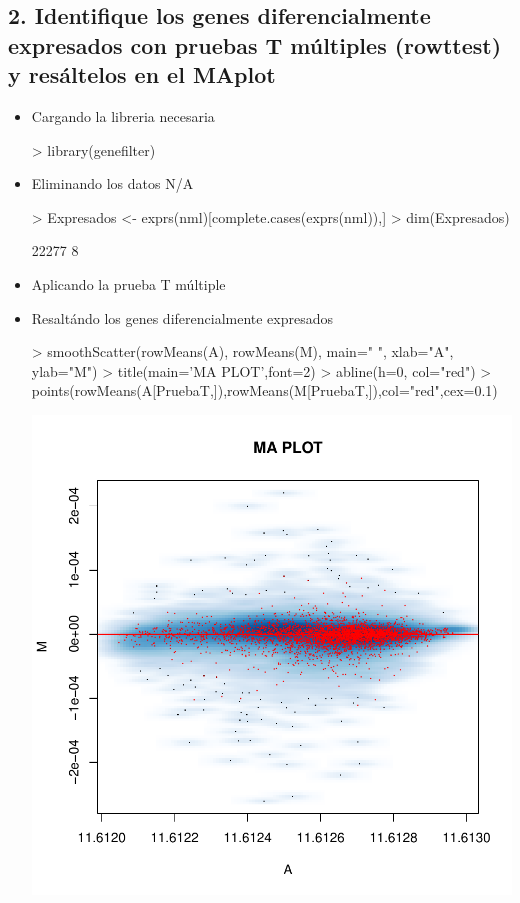\documentclass[12pt]{article}
\begin{document}
\subsection*{2. Identifique los genes diferencialmente expresados con pruebas T múltiples (rowttest) y resáltelos en el MAplot}

\begin{itemize}
\item{Cargando la libreria necesaria}
\begin{Schunk}
\begin{Sinput}
> library(genefilter)
\end{Sinput}
\end{Schunk}
\item{Eliminando los datos N/A}
\begin{Schunk}
\begin{Sinput}
> Expresados <- exprs(nml)[complete.cases(exprs(nml)),]
> dim(Expresados)
\end{Sinput}
\begin{Soutput}
[1] 22277     8
\end{Soutput}
\end{Schunk}
\item{Aplicando la prueba T múltiple}
\begin{Schunk}
\end{Schunk}
\item{Resaltándo los genes diferencialmente expresados}
\begin{Schunk}
\begin{Sinput}
> smoothScatter(rowMeans(A), rowMeans(M), main=" ", xlab="A", ylab="M")
> title(main='MA PLOT',font=2)
> abline(h=0, col="red")
> points(rowMeans(A[PruebaT,]),rowMeans(M[PruebaT,]),col="red",cex=0.1)
\end{Sinput}
\end{Schunk}
\includegraphics{JuanHenao_Taller3-011}
\end{itemize}
\end{document}

